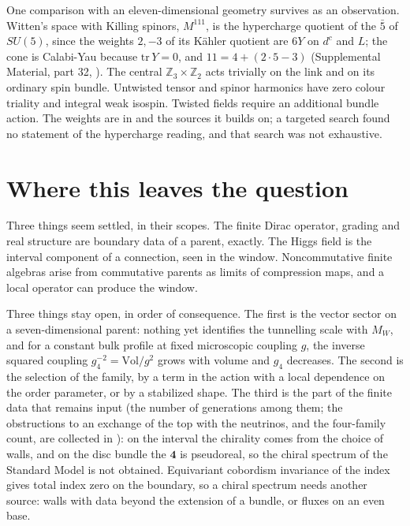 \documentclass[aps,prd,reprint,onecolumn,nofootinbib,amsmath,amssymb,floatfix]{revtex4-2}
\theoremstyle{plain}
\newcommand{\supp}[1]{Supplemental Material, part #1}
\begin{document}
One comparison with an eleven-dimensional geometry survives as an observation. Witten's space with Killing spinors, $M^{111}$, is the hypercharge quotient of the $\bar5$ of $SU(5)$, since the weights $2,-3$ of its K\"ahler quotient are $6Y$ on $d^c$ and $L$; the cone is Calabi-Yau because $\mathrm{tr}\,Y=0$, and $11=4+(2\cdot5-3)$ (\supp{32}, \cite{Witten1981,Fabbri1999}). The central $\mathbb Z_3\times\mathbb Z_2$ acts trivially on the link and on its ordinary spin bundle. Untwisted tensor and spinor harmonics have zero colour triality and integral weak isospin. Twisted fields require an additional bundle action. The weights are in \cite{Fabbri1999} and the sources it builds on; a targeted search found no statement of the hypercharge reading, and that search was not exhaustive.

\section{Where this leaves the question}

Three things seem settled, in their scopes. The finite Dirac operator, grading and real structure are boundary data of a parent, exactly. The Higgs field is the interval component of a connection, seen in the window. Noncommutative finite algebras arise from commutative parents as limits of compression maps, and a local operator can produce the window.

Three things stay open, in order of consequence. The first is the vector sector on a seven-dimensional parent: nothing yet identifies the tunnelling scale with $M_W$, and for a constant bulk profile at fixed microscopic coupling $g$, the inverse squared coupling $g_4^{-2}=\mathrm{Vol}/g^2$ grows with volume and $g_4$ decreases. The second is the selection of the family, by a term in the action with a local dependence on the order parameter, or by a stabilized shape. The third is the part of the finite data that remains input (the number of generations among them; the obstructions to an exchange of the top with the neutrinos, and the four-family count, are collected in \cite{gennote}): on the interval the chirality comes from the choice of walls, and on the disc bundle the $\mathbf 4$ is pseudoreal, so the chiral spectrum of the Standard Model is not obtained. Equivariant cobordism invariance of the index \cite{Witten1983} gives total index zero on the boundary, so a chiral spectrum needs another source: walls with data beyond the extension of a bundle, or fluxes on an even base.
\end{document}
